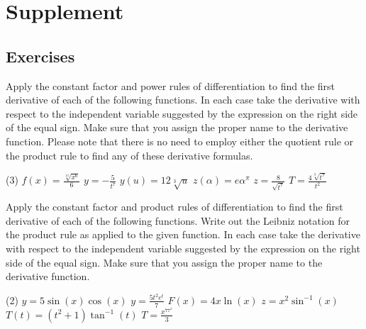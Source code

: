 \documentclass[10pt,oneside,]{book}
\theoremstyle{plain}
\theoremstyle{definition}
\numberwithin{equation}{section}
\newcommand{\fe}[2]{#1\mathopen{}\left(#2\right)\mathclose{}}
\begin{document}
\section[Supplement]{Supplement}\label{derivative-formulas-supplementary-exercises}
\typeout{************************************************}
\typeout{************************************************}
\subsection[Exercises]{Exercises}\label{exercises-42}
Apply the constant factor and power rules of differentiation to find the first derivative of each of the following functions.  In each case take the derivative with respect to the independent variable suggested by the expression on the right side of the equal sign.  Make sure that you assign the proper name to the derivative function.  Please note that there is no need to employ either the quotient rule or the product rule to find any of these derivative formulas.%
\par
\begin{exercisegroup}(3)
\exercise[1.]\hypertarget{exercise-401}{\null}\(\fe{f}{x}=\frac{\sqrt[11]{x^6}}{6}\)%
\exercise[2.]\hypertarget{exercise-402}{\null}\(y=-\frac{5}{t^7}\)%
\exercise[3.]\hypertarget{exercise-403}{\null}\(\fe{y}{u}=12\sqrt[3]{u}\)%
\exercise[4.]\hypertarget{exercise-404}{\null}\(\fe{z}{\alpha}=e\alpha^{\pi}\)%
\exercise[5.]\hypertarget{exercise-405}{\null}\(z=\frac{8}{\sqrt{t^7}}\)%
\exercise[6.]\hypertarget{exercise-406}{\null}\(T=\frac{4\sqrt[3]{t^7}}{t^2}\)%
\end{exercisegroup}
\par\smallskip\noindent
Apply the constant factor and product rules of differentiation to find the first derivative of each of the following functions.   Write out the Leibniz notation for the product rule as applied to the given function. In each case take the derivative with respect to the independent variable suggested by the expression on the right side of the equal sign.  Make sure that you assign the proper name to the derivative function.%
\par
\begin{exercisegroup}(2)
\exercise[7.]\hypertarget{exercise-407}{\null}\(y=5\fe{\sin}{x}\fe{\cos}{x}\)%
\exercise[8.]\hypertarget{exercise-408}{\null}\(y=\frac{5t^2e^t}{7}\)%
\exercise[9.]\hypertarget{exercise-409}{\null}\(\fe{F}{x}=4x\fe{\ln}{x}\)%
\exercise[10.]\hypertarget{exercise-410}{\null}\(z=x^2\fe{\sin^{-1}}{x}\)%
\exercise[11.]\hypertarget{exercise-411}{\null}\(\fe{T}{t}=(t^2+1)\fe{\tan^{-1}}{t}\)%
\exercise[12.]\hypertarget{exercise-412}{\null}\(T=\frac{x^77^x}{3}\)%
\end{exercisegroup}
\end{document}
